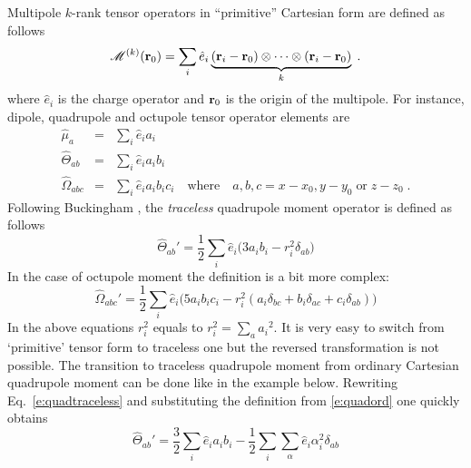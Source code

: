 \documentclass[b5paper,oneside,fleqn,11pt]{book}
\begin{document}
\begin{appendices}
\begin{refsection}
Multipole $k$-rank tensor operators in ``primitive'' 
Cartesian form are defined as follows
%
\begin{equation} \label{e:m-operator}
\mathscr{M}^{(k)}({\bf r}_0) = \sum_i \hat{e}_i \underbrace{({\mathbf r}_i - {\bf r}_0) 
                      \otimes \cdots \otimes ({\mathbf r}_i - {\bf r}_0)}_{k}  \;.
\end{equation}
%
where $\hat{e}_i$ is the charge operator
and ${\bf r}_0$ is the origin of the multipole. 
For instance, dipole, quadrupole and octupole tensor 
operator elements are
%
\begin{eqnarray}\label{e:quadord}
\hat{\mu}_a         &=& \sum_i \hat{e}_i a_i \\
\hat{\Theta}_{ab}   &=& \sum_i \hat{e}_i a_i b_i \\
\hat{\Omega}_{abc}  &=& \sum_i \hat{e}_i a_i b_i c_i \quad  \textrm{where} \quad a,b,c=x-x_0,y-y_0 \; \textrm{or} \; z-z_0 \;.
\end{eqnarray}
%
Following Buckingham \citep{Buckingham.QRevChemSoc.1959}, the \emph{traceless} 
quadrupole 
moment operator is defined as follows
%
\begin{equation}\label{e:quadtraceless}
\hat{\Theta}_{ab}' = \frac{1}{2}\sum_i \hat{e}_i \big( 3a_ib_i-r_i^2\delta_{ab}\big)
\end{equation}
%
In the case of octupole moment the definition is a bit more 
complex:
\begin{equation}
\hat{\Omega}_{abc}' = \frac{1}{2}\sum_i \hat{e}_i   \big( 5a_ib_ic_i-r_i^2(a_i\delta_{bc}+
                                                                     b_i\delta_{ac}+
                                                                     c_i\delta_{ab})\big) 
\end{equation}
In the above equations $r_i^2$ equals to
%
$r_i^2 = \sum_a {a_i}^2   $.
%
It is very easy to switch from `primitive' tensor form to 
traceless one but the reversed transformation is not possible. 
The transition to traceless
quadrupole moment from ordinary Cartesian quadrupole moment 
can be done like in the example below. Rewriting 
Eq.~\ref{e:quadtraceless} and substituting the definition from 
\ref{e:quadord} one quickly obtains
%
\begin{equation}
\hat{\Theta}_{ab}' = \frac{3}{2}\sum_i \hat{e}_ia_ib_i - \frac{1}{2}\sum_i\sum_{\alpha}\hat{e}_i\alpha_i^2\delta_{ab} 

\end{equation}
\end{refsection}
\end{appendices}
\end{document}
